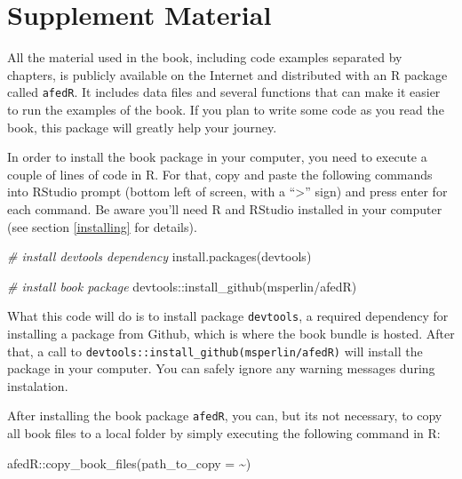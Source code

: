 \documentclass[
  12pt,
]{book}
\newenvironment{Shaded}{\begin{snugshade}}{\end{snugshade}}
\newcommand{\AttributeTok}[1]{\textcolor[rgb]{0.61,0.61,0.61}{#1}}
\newcommand{\CommentTok}[1]{\textcolor[rgb]{0.37,0.37,0.37}{\textit{#1}}}
\newcommand{\FunctionTok}[1]{\textcolor[rgb]{0,0,0}{#1}}
\newcommand{\NormalTok}[1]{#1}
\newcommand{\SpecialCharTok}[1]{\textcolor[rgb]{0,0,0}{#1}}
\newcommand{\StringTok}[1]{\textcolor[rgb]{0.5,0.5,0.5}{#1}}
\begin{document}
\hypertarget{supplement-material}{%
\section*{Supplement Material}\label{supplement-material}}

All the material used in the book, including code examples separated by chapters, is publicly available on the Internet and distributed with an R package called \texttt{afedR}. It includes data files and several functions that can make it easier to run the examples of the book. If you plan to write some code as you read the book, this package will greatly help your journey.

In order to install the book package in your computer, you need to execute a couple of lines of code in R. For that, copy and paste the following commands into RStudio prompt (bottom left of screen, with a ``\textgreater{}'' sign) and press enter for each command. Be aware you'll need R and RStudio installed in your computer (see section \ref{installing} for details).

\begin{Shaded}
\begin{Highlighting}[]
\CommentTok{\# install devtools dependency}
\FunctionTok{install.packages}\NormalTok{(}\StringTok{\textquotesingle{}devtools\textquotesingle{}}\NormalTok{)}

\CommentTok{\# install book package}
\NormalTok{devtools}\SpecialCharTok{::}\FunctionTok{install\_github}\NormalTok{(}\StringTok{\textquotesingle{}msperlin/afedR\textquotesingle{}}\NormalTok{)}
\end{Highlighting}
\end{Shaded}

What this code will do is to install package \texttt{devtools}, a required dependency for installing a package from Github, which is where the book bundle is hosted. After that, a call to \texttt{devtools::install\_github(\textquotesingle{}msperlin/afedR\textquotesingle{})} will install the package in your computer. You can safely ignore any warning messages during instalation.

After installing the book package \texttt{afedR}, you can, but its not necessary, to copy all book files to a local folder by simply executing the following command in R:

\begin{Shaded}
\begin{Highlighting}[]
\NormalTok{afedR}\SpecialCharTok{::}\FunctionTok{copy\_book\_files}\NormalTok{(}\AttributeTok{path\_to\_copy =} \StringTok{\textquotesingle{}\textasciitilde{}\textquotesingle{}}\NormalTok{)}
\end{Highlighting}
\end{Shaded}
\end{document}
